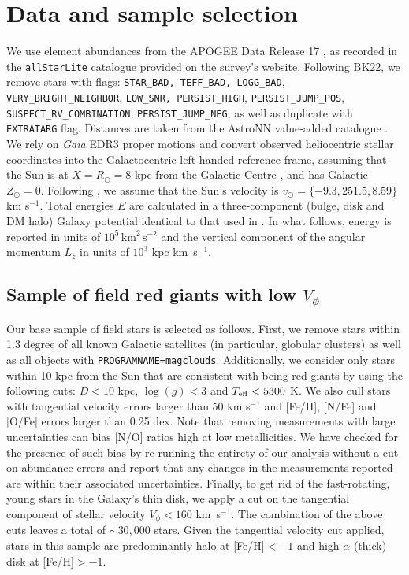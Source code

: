 \documentclass[a4paper,useAMS,usenatbib]{mnras}
\begin{document}
\section{Data and sample selection}
\label{sec:data}

We use element abundances from the APOGEE Data Release 17 \citep[][]{apogeedr17}, as recorded in the \texttt{allStarLite} catalogue provided on the survey's website. Following BK22, we remove stars with flags:
\verb|STAR_BAD, TEFF_BAD, LOGG_BAD|, \verb|VERY_BRIGHT_NEIGHBOR|, \verb|LOW_SNR, PERSIST_HIGH|, \verb|PERSIST_JUMP_POS|,  \verb|SUSPECT_RV_COMBINATION|, \verb|PERSIST_JUMP_NEG|,  as well as duplicate with \verb|EXTRATARG| flag.
Distances are taken from the AstroNN value-added catalogue \citep[see][]{Leung2019,Mackereth2018}. 
We rely on {\it Gaia} EDR3 proper motions \citep[][]{gaia_edr3,Lindegren2021} and convert observed heliocentric stellar coordinates into the Galactocentric left-handed reference frame, assuming that the Sun is at $X=R_{\odot}=8$ kpc from the Galactic Centre \citep[c.f. a slightly larger value from][]{GRAVITY2022}, and has Galactic $Z_{\odot}=0$. Following \citet{Drimmel2022}, we assume that the Sun's velocity is $v_{\odot}=\{-9.3, 251.5, 8.59\}$ km s$^{-1}$. Total energies $E$ are calculated in a three-component (bulge, disk and DM halo) Galaxy potential identical to that used in \citet{wrinkles}. In what follows, energy is reported in units of $10^5\,\mathrm{km}^2\,\mathrm{s}^{-2}$ and the vertical component of the angular momentum $L_z$ in units of $10^3$ kpc km~s$^{-1}$. 

\subsection{Sample of field red giants with low $V_{\phi}$}
\label{sec:star_sample}

Our base sample of field stars is selected as follows. First, we remove stars within 1.3 degree of all known Galactic satellites (in particular, globular clusters) as well as all objects with  \texttt{PROGRAMNAME=magclouds}. Additionally, we consider only stars within 10 kpc from the Sun that are consistent with being red giants by using the following cuts: $D<10$ kpc, $\log(g)<3$ and $T_{\rm eff}<5300$ K. We also cull stars with tangential velocity errors larger than 50 km s$^{-1}$ and [Fe/H], [N/Fe] and [O/Fe] errors larger than 0.25 dex. Note that removing measurements with large uncertainties can bias [N/O] ratios high at low metallicities. We have checked for the presence of such bias by re-running the entirety of our analysis without a cut on abundance errors and report that any changes in the measurements reported are within their associated uncertainties. Finally, to get rid of the fast-rotating, young stars in the Galaxy's thin disk, we apply a cut on the tangential component of stellar velocity $V_{\phi}<160$ km~s$^{-1}$.  The combination of the above cuts leaves a total of $\sim30,000$ stars. Given the tangential velocity cut applied, stars in this sample are predominantly halo at [Fe/H]$<-1$ and high-$\alpha$ (thick) disk at [Fe/H]$>-1$.
\end{document}
